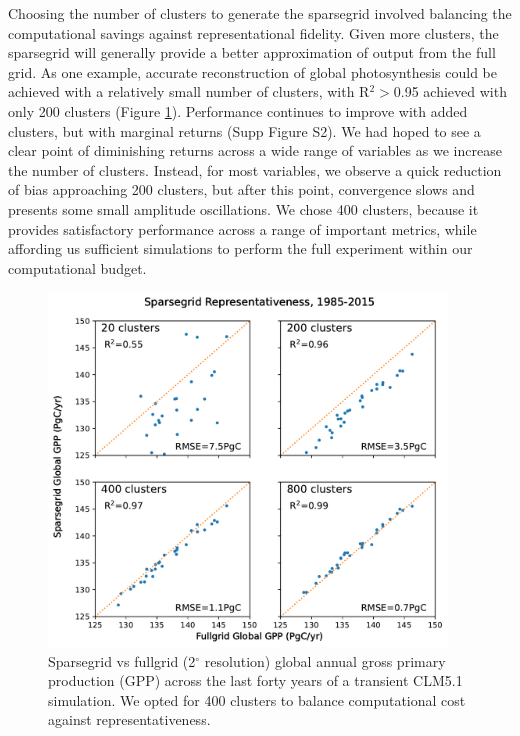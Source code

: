 \documentclass[draft]{agujournal2019}
\begin{document}
Choosing the number of clusters to generate the sparsegrid involved balancing the computational savings against representational fidelity. Given more clusters, the sparsegrid will generally provide a better approximation of output from the full grid. As one example, accurate reconstruction of global photosynthesis could be achieved with a relatively small number of clusters, with R$^2>$0.95 achieved with only 200 clusters (Figure \ref{fig:sg}).
Performance continues to improve with added clusters, but with marginal returns (Supp Figure S2).
We had hoped to see a clear point of diminishing returns across a wide range of variables as we increase the number of clusters. Instead, for most variables, we observe a quick reduction of bias approaching 200 clusters, but after this point, convergence slows and presents some small amplitude oscillations. We chose 400 clusters, because it provides satisfactory performance across a range of important metrics, while affording us sufficient simulations to perform the full experiment within our computational budget.
\begin{figure}[h]
\centering
\includegraphics[width=25pc]{../figs/main/sparsegrid_gpp.pdf}
\caption{Sparsegrid vs fullgrid (2$^{\circ}$ resolution) global annual gross primary production (GPP) across the last forty years of a transient CLM5.1 simulation. We opted for 400 clusters to balance computational cost against representativeness.}
\label{fig:sg}
\end{figure}
\end{document}
